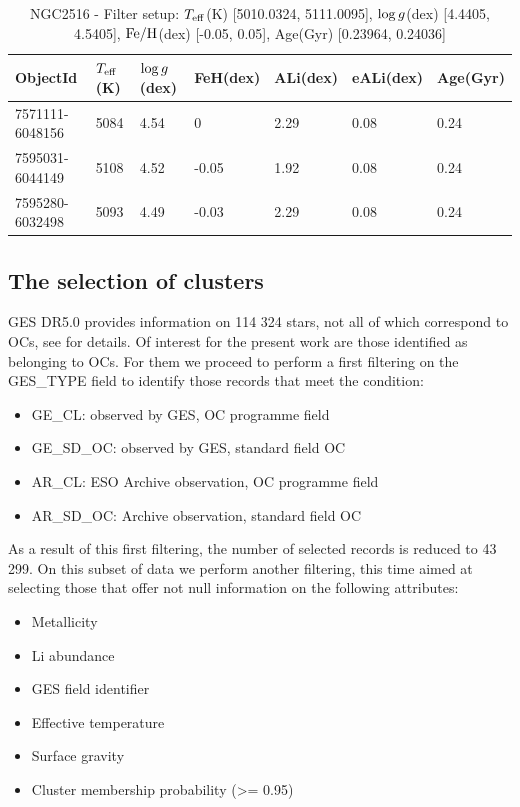 \documentclass[fleqn,usenatbib]{mnras}
\begin{document}
\begin{table}
	\centering
	\begin{tabular}{l l l l l l l} 
		\hline
            ObjectId & $T_{\mathrm{eff}}$(K) & $\mathrm{log} \, g$(dex) & FeH(dex) & ALi(dex) & eALi(dex) & Age(Gyr)\\
		\hline
            7571111-6048156 & 5084 & 4.54 & 0 & 2.29 & 0.08 & 0.24\\ 
            7595031-6044149 & 5108 & 4.52 & -0.05 & 1.92 & 0.08 & 0.24\\ 
            7595280-6032498 & 5093 & 4.49 & -0.03 & 2.29 & 0.08 & 0.24\\ 
            \hline
	\end{tabular}
 	\caption{NGC2516 - Filter setup: $T_{\mathrm{eff}}$(K) [5010.0324, 5111.0095], $\mathrm{log} \, g$(dex) [4.4405, 4.5405], $\mathrm{Fe}/\mathrm{H}$(dex) [-0.05, 0.05], Age(Gyr) [0.23964, 0.24036]}
	\label{tab:oc_ngc2516}

\end{table}


\subsection{The selection of clusters}
GES DR5.0 provides information on 114 324 stars, not all of which correspond to OCs, see \cite{Gilmore2022} for details. Of interest for the present work are those identified as belonging to OCs. For them we proceed to perform a first filtering on the GES\_TYPE field to identify those records that meet the condition:
\begin{itemize}
    \item GE\_CL: observed by GES, OC programme field
    \item GE\_SD\_OC: observed by GES, standard field OC
    \item AR\_CL: ESO Archive observation, OC programme field
    \item AR\_SD\_OC: Archive observation, standard field OC
\end{itemize}

As a result of this first filtering, the number of selected records is reduced to 43 299. On this subset of data we perform another filtering, this time aimed at selecting those that offer not null information on the following attributes:
\begin{itemize}
    \item Metallicity
    \item Li abundance
    \item GES field identifier
    \item Effective temperature
    \item Surface gravity
    \item Cluster membership probability (>= 0.95)
\end{itemize}
\end{document}
